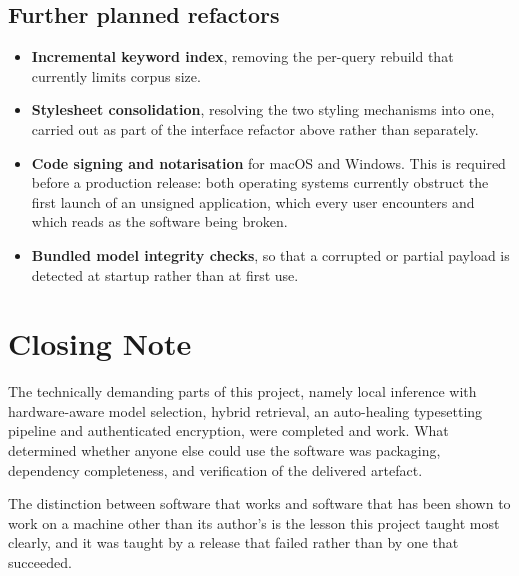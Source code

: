 \documentclass[11pt,a4paper]{article}
\begin{document}
\subsection{Further planned refactors}

\begin{itemize}[leftmargin=*]
  \item \textbf{Incremental keyword index}, removing the per-query rebuild that
        currently limits corpus size.
  \item \textbf{Stylesheet consolidation}, resolving the two styling mechanisms
        into one, carried out as part of the interface refactor above rather
        than separately.
  \item \textbf{Code signing and notarisation} for macOS and Windows. This is
        required before a production release: both operating systems currently
        obstruct the first launch of an unsigned application, which every user
        encounters and which reads as the software being broken.
  \item \textbf{Bundled model integrity checks}, so that a corrupted or partial
        payload is detected at startup rather than at first use.
\end{itemize}

\section{Closing Note}

The technically demanding parts of this project, namely local inference with
hardware-aware model selection, hybrid retrieval, an auto-healing typesetting
pipeline and authenticated encryption, were completed and work. What determined
whether anyone else could use the software was packaging, dependency
completeness, and verification of the delivered artefact.

The distinction between software that works and software that has been shown to
work on a machine other than its author's is the lesson this project taught most
clearly, and it was taught by a release that failed rather than by one that
succeeded.
\end{document}
